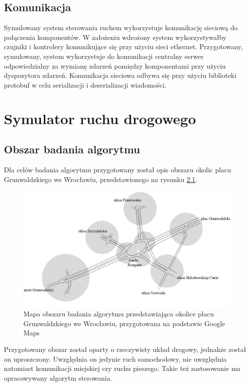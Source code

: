\section{Komunikacja}
\label{chap:komunikacja}
Symulowany system sterowania ruchem wykorzystuje komunikację sieciową do połączenia komponentów. W założeniu wdrożony system wykorzystywałby czujniki i kontrolery komunikujące się przy użyciu sieci ethernet. Przygotowany, symulowany, system wykorzystuje do komunikacji centralny serwer odpowiedzialny za wymianę zdarzeń pomiędzy komponentami przy użyciu dyspozytora zdarzeń. Komunikacja sieciowa odbywa się przy użyciu biblioteki protobuf \cite{protobuf} w celu serializacji i deserializacji wiadomości.

\chapter{Symulator ruchu drogowego}
\label{chap:symulacja}
\section{Obszar badania algorytmu}
Dla celów badania algorytmu przygotowany został opis obszaru okolic placu Grunwaldzkiego we Wrocławiu, przedstawionego na rysunku \ref{fig:mapa_czysta}.

\begin{figure}[h]
    \centering
    \includegraphics[width=1.0\textwidth]{images/mapa_czysta.png}
    \caption{Mapa obszaru badania algorytmu przedstawiająca okolice placu Grunwaldzkiego we Wrocławiu, przygotowana na podstawie Google Maps \cite{google_maps}}
    \label{fig:mapa_czysta}
\end{figure}

Przygotowany obszar został oparty o rzeczywisty układ drogowy, jednakże został on uproszczony. Uwzględnia on jedynie ruch samochodowy, nie uwzględnia natomiast komunikacji miejskiej czy ruchu pieszego. Takie też zastosowanie ma opracowywany algorytm sterowania.

